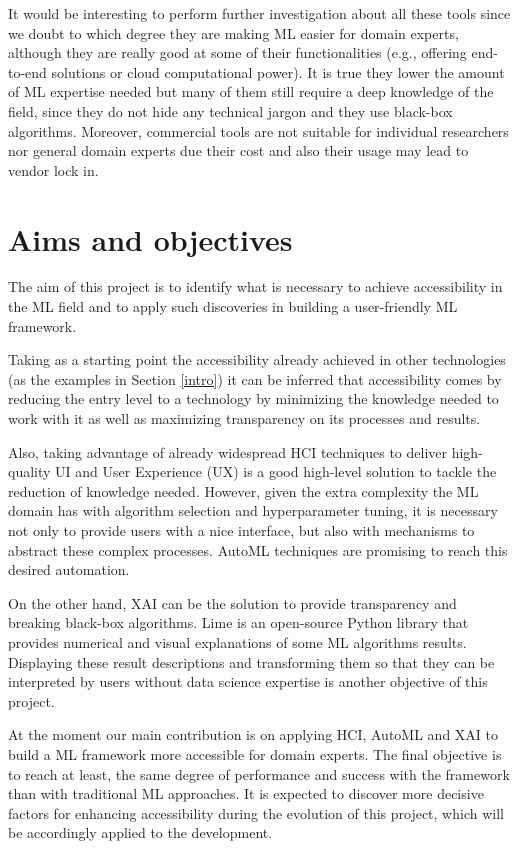\documentclass[runningheads]{llncs}
\begin{document}
It would be interesting to perform further investigation about all these tools since we doubt to which degree they are making ML easier for domain experts, although they are really good at some of their functionalities (e.g., offering end-to-end solutions or cloud computational power). It is true they lower the amount of ML expertise needed but many of them still require a deep knowledge of the field, since they do not hide any technical jargon and they use black-box algorithms. Moreover, commercial tools are not suitable for individual researchers nor general domain experts due their cost \cite{pennAI} and also their usage may lead to vendor lock in. 

\section{Aims and objectives}

The aim of this project is to identify what is necessary to achieve accessibility in the ML field and to apply such discoveries in building a user-friendly ML framework.

Taking as a starting point the accessibility already achieved in other technologies (as the examples in Section \ref{intro}) it can be inferred that accessibility comes by reducing the entry level to a technology by minimizing the knowledge needed to work with it as well as maximizing transparency on its processes and results. 

Also, taking advantage of already widespread HCI techniques to deliver high-quality UI and User Experience (UX) is a good high-level solution to tackle the reduction of knowledge needed.  However, given the extra complexity the ML domain has with algorithm selection and hyperparameter tuning, it is necessary not only to provide users with a nice interface, but also with mechanisms to abstract these complex processes. AutoML techniques are promising to reach this desired automation.

On the other hand, XAI can be the solution to provide transparency and breaking black-box algorithms. Lime \cite{lime} is an open-source Python library that provides numerical and visual explanations of some ML algorithms results. Displaying these result descriptions and transforming them so that they can be interpreted by users without data science expertise is another objective of this project.

At the moment our main contribution is on applying HCI, AutoML and XAI to build a ML framework more accessible for domain experts. The final objective is to reach at least, the same degree of performance and success with the framework than with traditional ML approaches. It is expected to discover more decisive factors for enhancing accessibility during the evolution of this project, which will be accordingly applied to the development. 
\end{document}
